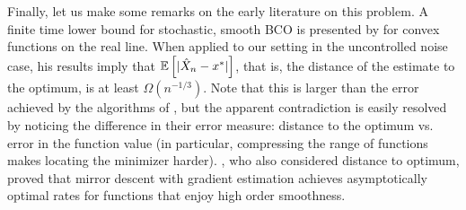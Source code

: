 Finally, let us make some remarks on the early literature on this problem.
A finite time lower bound for stochastic, smooth BCO is presented by  \citet{Chen88:LB-AoS} for
convex functions on the real line. When applied to our setting in the uncontrolled noise case, his results imply that $\mathbb{E}\left[ |\hat{X}_n - x^* |\right]$, that is, the distance of the estimate to the optimum, is at least $\Omega(n^{-1/3})$. 
Note that this is larger than the error achieved by the algorithms of \citet{liang2014zeroth,BubeckDKP15,BuEl15}, but the apparent contradiction is easily resolved by noticing the difference in their error measure: distance to the optimum vs. error in the function value (in particular, compressing the range of functions makes locating the minimizer harder).
 \citet{PoTsy90}, who also considered distance to optimum, proved that mirror descent with gradient estimation achieves asymptotically optimal rates for functions that enjoy high order smoothness.

